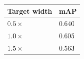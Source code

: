 \begin{tabular}{ll}
\toprule
Target width & mAP \\
\midrule
$0.5\times$ & 0.640 \\
$1.0\times$ & 0.605 \\
$1.5\times$ & 0.563 \\
\bottomrule
\end{tabular}
